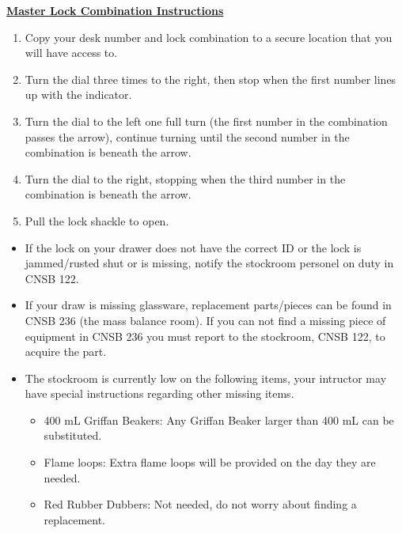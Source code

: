 \documentclass[12pt]{article}
\begin{document}
\begin{minipage}{0.4\textwidth}
\underline{{\large \textbf{Master Lock Combination Instructions}}}
\begin{enumerate}
\item Copy your desk number and lock combination to a secure location that you will have access to.
\item Turn the dial three times to the right, then stop when the first number lines up with the indicator.
\item Turn the dial to the left one full turn (the first number in the combination passes the arrow), continue turning until the second number in the combination is beneath the arrow.
\item Turn the dial to the right, stopping when the third number in the combination is beneath the arrow.
\item Pull the lock shackle to open.
\end{enumerate}
\end{minipage}
\begin{itemize}
\item If the lock on your drawer does not have the correct ID or the lock is jammed/rusted shut or is missing, notify the stockroom personel on duty in CNSB 122.
\item If your draw is missing glassware, replacement parts/pieces can be found in CNSB 236 (the mass balance room). If you can not find a missing piece of equipment in CNSB 236 you must report to the stockroom, CNSB 122, to acquire the part.
\item The stockroom is currently low on the following items, your intructor may have special instructions regarding other missing items.
\begin{itemize}
\item 400 mL Griffan Beakers: Any Griffan Beaker larger than 400 mL can be substituted.
\item Flame loops: Extra flame loops will be provided on the day they are needed.
\item Red Rubber Dubbers: Not needed, do not worry about finding a replacement.
\end{itemize}
\end{itemize}
\end{document}
